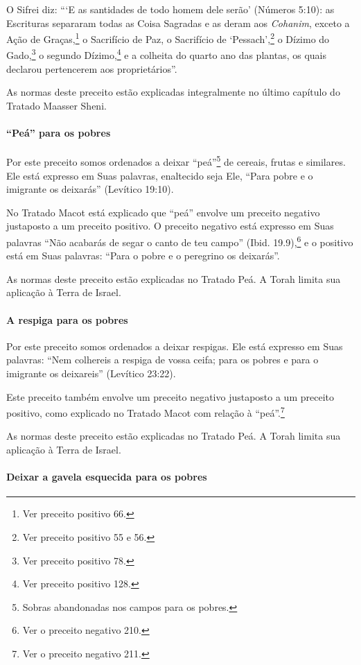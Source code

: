 O Sifrei diz: ```E as santidades de todo homem dele serão' (Números 5:10): as Escrituras separaram todas as Coisa Sagradas e as deram
aos \textit{Cohanim}, exceto a Ação de Graças,\footnote{Ver preceito positivo 66.} o Sacrifício de Paz, o Sacrifício de `Pessach',\footnote{Ver preceito positivo 55 e 56.} o Dízimo do Gado,\footnote{Ver preceito positivo 78.} o segundo Dízimo,\footnote{Ver preceito positivo 128.} e a colheita do quarto ano
das plantas, os quais declarou pertencerem aos proprietários''.

As normas deste preceito estão explicadas integralmente no último
capítulo do Tratado Maasser Sheni.


\paragraph{``Peá'' para os pobres}

Por este preceito somos ordenados a deixar ``peá''\footnote{Sobras abandonadas nos campos para os pobres.}
de cereais, frutas e similares. Ele está expresso em Suas palavras,
enaltecido seja Ele, ``Para pobre e o imigrante os deixarás'' (Levítico 19:10).

No Tratado Macot está explicado que ``peá'' envolve um preceito negativo
justaposto a um preceito positivo. O preceito negativo está expresso
em Suas palavras ``Não acabarás de segar o canto de teu campo'' (Ibid.
19.9),\footnote{Ver o preceito negativo 210.} e o positivo está em Suas palavras: ``Para o pobre e o peregrino os
deixarás''.

As normas deste preceito estão explicadas no Tratado Peá. A Torah limita
sua aplicação à Terra de Israel.

\paragraph{A respiga para os pobres}

Por este preceito somos ordenados a deixar respigas. Ele está expresso
em Suas palavras: ``Nem colhereis a respiga de vossa ceifa; para os
pobres e para o imigrante os deixareis'' (Levítico 23:22).

Este preceito também envolve um preceito negativo justaposto a um
preceito positivo, como explicado no Tratado Macot com relação à
``peá''.\footnote{Ver o preceito negativo 211.}


As normas deste preceito estão explicadas no Tratado Peá. A Torah limita
sua aplicação à Terra de Israel.

\paragraph{Deixar a gavela esquecida para os pobres}

